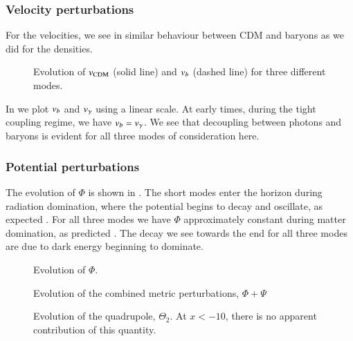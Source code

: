 \subsubsection{Velocity perturbations}\label{sssec:M3:results:velocity_perturbations}
For the velocities, we see in  similar behaviour between CDM and baryons as we did for the densities. 

\begin{figure}[ht!]
    \caption{Evolution of $v_\mathrm{CDM}$ (solid line) and $v_b$ (dashed line) for three different modes.}
    \label{fig:M3:results:vel_CDM_b}
\end{figure}

In  we plot $v_b$ and $v_\gamma$ using a linear scale. At early times, during the tight coupling regime, we have $v_b=v_\gamma$. We see that decoupling between photons and baryons is evident for all three modes of consideration here.  



\subsubsection{Potential perturbations} \label{sssec:M3:results:metric_perturbations}
The evolution of $\Phi$ is shown in . The short modes enter the horizon during radiation domination, where the potential begins to decay and oscillate, as expected . For all three modes we have $\Phi$ approximately constant during matter domination, as predicted . The decay we see towards the end for all three modes are due to dark energy beginning to dominate. 
\begin{figure}[ht!]
    \caption{Evolution of $\Phi$.}
    \label{fig:M3:results:Phi}
\end{figure}


\begin{figure}[ht!]
    \caption{Evolution of the combined metric perturbations, $\Phi+\Psi$}
    \label{fig:M3:results:Phi_plus_Psi}
\end{figure}



\begin{figure}[ht!]
    \caption{Evolution of the quadrupole, $\Theta_2$. At $x<-10$, there is no apparent contribution of this quantity.}
    \label{fig:M3:results:Theta2}
\end{figure}
